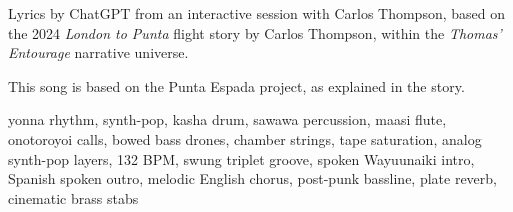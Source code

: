 
\label{sec:punta-espada}
\begin{notes}
Lyrics by ChatGPT from an interactive session with Carlos Thompson, %
based on the 2024 \emph{London to Punta} flight story by Carlos Thompson, within the \emph{Thomas’ Entourage} narrative universe.

This song is based on the Punta Espada project, as explained in the story.
\end{notes}
\begin{style}
yonna rhythm, synth-pop, kasha drum, sawawa percussion, maasi flute, onotoroyoi calls, bowed bass drones, chamber strings, tape saturation, analog synth-pop layers, 132 BPM, swung triplet groove, spoken Wayuunaiki intro, Spanish spoken outro, melodic English chorus, post-punk bassline, plate reverb, cinematic brass stabs
\end{style}

